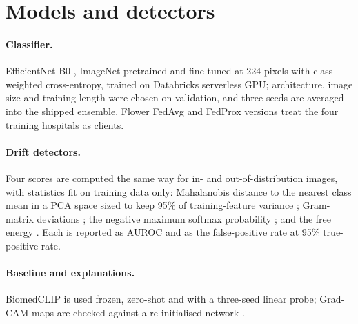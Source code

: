 \documentclass[11pt]{article}
\begin{document}
\section{Models and detectors}
\paragraph{Classifier.} EfficientNet-B0 \cite{tan2019}, ImageNet-pretrained and fine-tuned at 224 pixels with
class-weighted cross-entropy, trained on Databricks serverless GPU; architecture, image size and
training length were chosen on validation, and three seeds are averaged into the shipped
ensemble. Flower FedAvg and FedProx versions treat the four training hospitals as clients.

\paragraph{Drift detectors.} Four scores are computed the same way for in- and
out-of-distribution images, with statistics fit on training data only: Mahalanobis distance to
the nearest class mean in a PCA space sized to keep 95\% of training-feature variance
\cite{lee2018}; Gram-matrix deviations \cite{sastry2020}; the negative maximum softmax
probability \cite{hendrycks2017}; and the free energy \cite{liu2020}. Each is reported as AUROC
and as the false-positive rate at 95\% true-positive rate.

\paragraph{Baseline and explanations.} BiomedCLIP \cite{zhang2023} is used frozen, zero-shot and
with a three-seed linear probe; Grad-CAM \cite{selvaraju2017} maps are checked against a
re-initialised network \cite{adebayo2018}.
\end{document}
